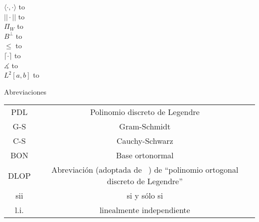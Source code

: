  $\langle \cdot, \cdot \rangle$ \hbox to\linewidth{\hfil Producto punto \hfil}  \\
 $|| \cdot ||$ \hbox to\linewidth{\hfil Norma \hfil} \\
 $\Pi_{W}$ \hbox to\linewidth{\hfil Proyección sobre el subespacio cerrado $W$ \hfil}  \\
 $B^{\perp}$ \hbox to\linewidth{\hfil Complemento ortogonal de un subconjunto $B$ de un espacio con producto punto. \hfil}  \\
 $\leq$ \hbox to\linewidth{\hfil Relación ``ser subespacio de'' \hfil}   \\
 $\lceil \cdot \rceil$ \hbox to\linewidth{\hfil Función techo \hfil}  \\
 $\measuredangle$ \hbox to\linewidth{\hfil Ángulo \hfil}  \\
 $L^{2}[a,b]$ \hbox to \\



\vspace{0.5cm}

\begin{center}
\huge{Abreviaciones}
\end{center}

\vspace{0.5cm}

\begin{tabular}{ c c }
 PDL & Polinomio discreto de Legendre \\
 G-S & Gram-Schmidt \\
 C-S & Cauchy-Schwarz \\
 BON & Base ortonormal \\
 DLOP & Abreviación (adoptada de ~\cite{Neuman})
 de ``polinomio ortogonal discreto de Legendre'' \\
 sii & si y sólo si \\
 l.i. & linealmente independiente
\end{tabular}




\newpage